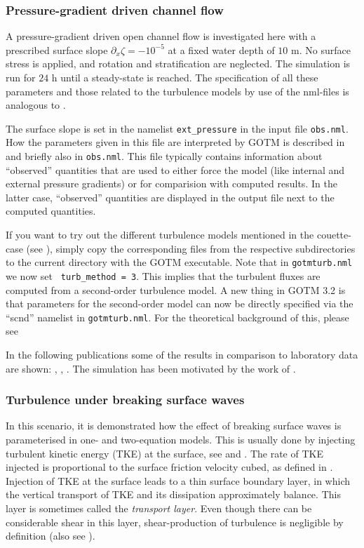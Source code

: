 \subsubsection{Pressure-gradient driven channel flow}\label{channel}

A pressure-gradient driven open channel flow is investigated here with
a prescribed surface slope $\partial_x\zeta=-10^{-5}$ at a fixed water
depth of $10$ m. No surface stress is applied, and rotation and
stratification are neglected.  The simulation is run for $24$ h until
a steady-state is reached. The specification of all these parameters
and those related to the turbulence models by use of the nml-files is
analogous to .

The surface slope is set in the namelist {\tt ext\_pressure} in the
input file {\tt obs.nml}. How the parameters given in this file are
interpreted by GOTM is described in  and briefly
also in {\tt obs.nml}. This file typically contains information about
``observed'' quantities that are used to either force the model (like
internal and external pressure gradients) or for comparision with
computed results. In the latter case, ``observed'' quantities are
displayed in the output file next to the computed quantities.

If you want to try out the different turbulence models mentioned in
the couette-case (see ), simply copy the corresponding
files from the respective subdirectories to the current directory with
the GOTM executable. Note that in {\tt gotmturb.nml} we now set {\tt
turb\_method = 3}. This implies that the turbulent fluxes are computed
from a second-order turbulence model. A new thing in GOTM 3.2 is that
parameters for the second-order model can now be directly specified
via the ``scnd'' namelist in {\tt gotmturb.nml}. For the theoretical
background of this, please see 

In the following publications some of the results in comparison to
laboratory data are shown: \cite{Burchardetal98}, \cite{Burchardetal99}, 
\cite{Burchard2002a}. The simulation has been motivated by
the work of \cite{BaumertRadach92}.



\subsubsection{Turbulence under breaking surface waves}\label{breaking_waves}

In this scenario, it is demonstrated how the effect of breaking
surface waves is parameterised in one- and two-equation models. This
is usually done by injecting turbulent kinetic energy (TKE) at the
surface, see \cite{CraigBanner94} and \cite{Craig96}. The rate of TKE
injected is proportional to the surface friction velocity cubed, as
defined in . Injection of TKE at the surface leads to a thin
surface boundary layer, in which the vertical transport of TKE and its
dissipation approximately balance. This layer is sometimes called the
\emph{transport layer}. Even though there can be considerable shear in
this layer, shear-production of turbulence is negligible by definition
(also see ).


